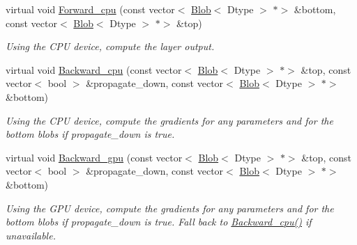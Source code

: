 \begin{DoxyCompactItemize}
\item 
\mbox{\label{classcaffe_1_1_dummy_data_layer_a4bcc61f06b232601fa4ea4fb4789db2c}} 
virtual void \mbox{\hyperlink{classcaffe_1_1_dummy_data_layer_a4bcc61f06b232601fa4ea4fb4789db2c}{Forward\+\_\+cpu}} (const vector$<$ \mbox{\hyperlink{classcaffe_1_1_blob}{Blob}}$<$ Dtype $>$ $\ast$$>$ \&bottom, const vector$<$ \mbox{\hyperlink{classcaffe_1_1_blob}{Blob}}$<$ Dtype $>$ $\ast$$>$ \&top)
\begin{DoxyCompactList}\small\item\em Using the C\+PU device, compute the layer output. \end{DoxyCompactList}\item 
\mbox{\label{classcaffe_1_1_dummy_data_layer_ac62a3b84e25b23ad3aa7c19409282188}} 
virtual void \mbox{\hyperlink{classcaffe_1_1_dummy_data_layer_ac62a3b84e25b23ad3aa7c19409282188}{Backward\+\_\+cpu}} (const vector$<$ \mbox{\hyperlink{classcaffe_1_1_blob}{Blob}}$<$ Dtype $>$ $\ast$$>$ \&top, const vector$<$ bool $>$ \&propagate\+\_\+down, const vector$<$ \mbox{\hyperlink{classcaffe_1_1_blob}{Blob}}$<$ Dtype $>$ $\ast$$>$ \&bottom)
\begin{DoxyCompactList}\small\item\em Using the C\+PU device, compute the gradients for any parameters and for the bottom blobs if propagate\+\_\+down is true. \end{DoxyCompactList}\item 
\mbox{\label{classcaffe_1_1_dummy_data_layer_a6e9d7a207d517c4e6727e6f9792c414c}} 
virtual void \mbox{\hyperlink{classcaffe_1_1_dummy_data_layer_a6e9d7a207d517c4e6727e6f9792c414c}{Backward\+\_\+gpu}} (const vector$<$ \mbox{\hyperlink{classcaffe_1_1_blob}{Blob}}$<$ Dtype $>$ $\ast$$>$ \&top, const vector$<$ bool $>$ \&propagate\+\_\+down, const vector$<$ \mbox{\hyperlink{classcaffe_1_1_blob}{Blob}}$<$ Dtype $>$ $\ast$$>$ \&bottom)
\begin{DoxyCompactList}\small\item\em Using the G\+PU device, compute the gradients for any parameters and for the bottom blobs if propagate\+\_\+down is true. Fall back to \mbox{\hyperlink{classcaffe_1_1_dummy_data_layer_ac62a3b84e25b23ad3aa7c19409282188}{Backward\+\_\+cpu()}} if unavailable. \end{DoxyCompactList}\item 

\end{DoxyCompactItemize}
